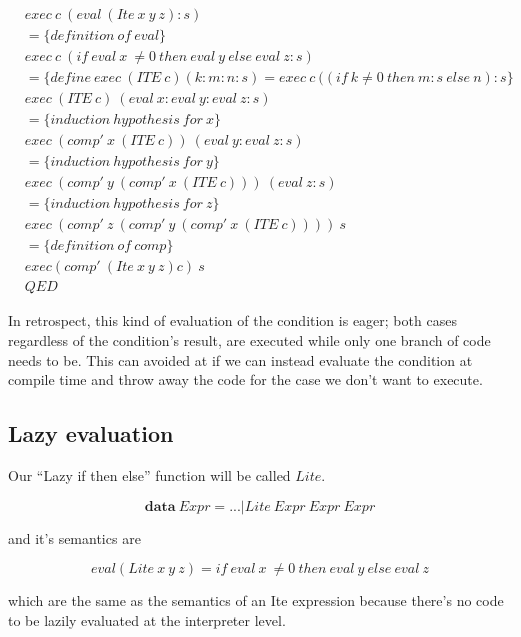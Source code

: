 \documentclass {article}
\begin{document}
\begin{align*}
	&exec \ c \ (eval \ (Ite \ x \ y \ z):s) \\
	&= \{definition \ of \ eval\} \\ 
	&exec \ c \ (if \ eval \ x \ \not= 0 \ then \ eval \ y \ else \ eval \ z :s) \\
	&= \{define\: exec \ (ITE \ c) (k : m : n : s) = exec \ c \ ((if \ k \not=0 \ then \ m : s\ else \ n) : s \} \\
	& exec \ (ITE \ c) \ (eval \ x : eval \ y : eval \ z : s) \\
	&= \{induction\ hypothesis \ for \ x \} \\
	& exec \ (comp' \ x \ (ITE \ c)) \ (eval \ y : eval \ z : s) \\
	&= \{induction\ hypothesis \ for \ y \} \\
	& exec \ (comp' \ y \ (comp' \ x \ (ITE \ c))) \ (eval \ z : s) \\
	&= \{induction\ hypothesis \ for \ z\} \\
	& exec \ (comp' \ z \ (comp' \ y \ (comp' \ x \ (ITE \ c)))) \ s \\
	&= \{definition \ of \ comp \} \\
	& exec (comp' \ (Ite \ x \ y \ z) c)  \ s \\
	&QED
\end{align*} 

In retrospect, this kind of evaluation of the condition
is eager; both cases regardless of the
condition's result, are executed
while only one branch of code needs to be.
This can avoided at if we can instead
evaluate the condition at compile time
and throw away the code for the case
we don't want to execute.

\subsection{Lazy evaluation}

\newcommand{\lite}{$Lite$}

Our ``Lazy if then else'' function
 will be called \lite.

	\[ \textbf{data} \ Expr = ... | Lite \ Expr \ Expr \ Expr \]

and it's semantics are

	\[eval(Lite \ x \ y \ z) = if \ eval \ x \ \not= 0 \ then \ eval \ y \ else \ eval \ z \]

which are the same as the semantics
of an Ite expression because 
there's no code to be
lazily evaluated
at the interpreter level.
\end{document}
